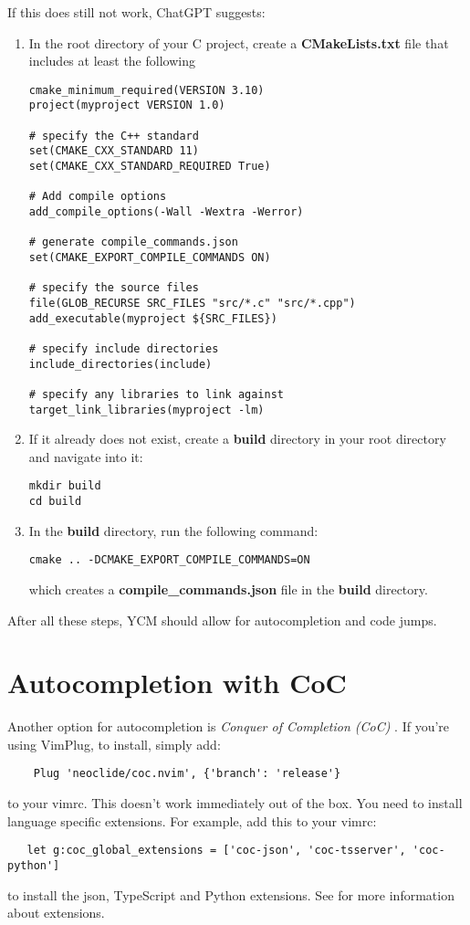 If this does still not work, ChatGPT suggests:
\begin{enumerate}
    \item In the root directory of your C project, create a
        \textbf{CMakeLists.txt} file that includes at least the following
\begin{lstlisting}
cmake_minimum_required(VERSION 3.10)
project(myproject VERSION 1.0)

# specify the C++ standard
set(CMAKE_CXX_STANDARD 11)
set(CMAKE_CXX_STANDARD_REQUIRED True)

# Add compile options
add_compile_options(-Wall -Wextra -Werror)

# generate compile_commands.json
set(CMAKE_EXPORT_COMPILE_COMMANDS ON)

# specify the source files
file(GLOB_RECURSE SRC_FILES "src/*.c" "src/*.cpp")
add_executable(myproject ${SRC_FILES})

# specify include directories
include_directories(include)

# specify any libraries to link against
target_link_libraries(myproject -lm)
\end{lstlisting}
    \item If it already does not exist, create a \textbf{build} directory in
        your root directory and navigate into it:
\begin{lstlisting}
mkdir build
cd build
\end{lstlisting}
    \item In the \textbf{build} directory, run the following command:
\begin{lstlisting}
cmake .. -DCMAKE_EXPORT_COMPILE_COMMANDS=ON
\end{lstlisting}
    which creates a \textbf{compile\_commands.json} file in the \textbf{build}
    directory.
\end{enumerate}
After all these steps, YCM should allow for autocompletion and code jumps.

\section{Autocompletion with CoC}
Another option for autocompletion is \emph{Conquer of Completion (CoC)}
\cite{neoclide2020conquer}. If you're using VimPlug, to install, simply add:
\begin{lstlisting}
    Plug 'neoclide/coc.nvim', {'branch': 'release'}
\end{lstlisting}
to your vimrc. This doesn't work immediately out of the box. You need to install
language specific extensions. For example, add this to your vimrc:
\begin{lstlisting}
   let g:coc_global_extensions = ['coc-json', 'coc-tsserver', 'coc-python']
\end{lstlisting}
to install the json, TypeScript and Python extensions. See
\cite{neoclide2020extensions} for more information about extensions.\\

